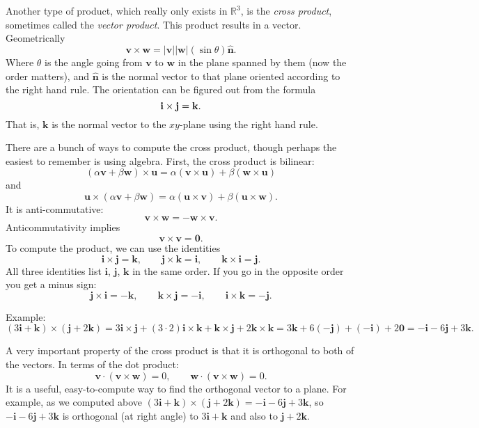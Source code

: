 \documentclass[12pt]{article}
\newcommand{\sabs}[1]{\lvert {#1} \rvert}
\newcommand{\R}{{\mathbb{R}}}
\newcommand{\veci}{\mathbf{i}}
\newcommand{\vecj}{\mathbf{j}}
\newcommand{\veck}{\mathbf{k}}
\newcommand{\avoidbreak}{\postdisplaypenalty=100}
\begin{document}
Another type of product, which really only exists in $\R^3$, is the
\emph{cross product},
sometimes called the \emph{vector product}.
This product results in a vector.
Geometrically
\[
\mathbf{v} \times \mathbf{w} = \sabs{\mathbf{v}} \sabs{\mathbf{w}} (\sin \theta) \hat{\mathbf{n}} .
\]
Where $\theta$ is the angle going from $\mathbf{v}$ to $\mathbf{w}$ in the plane spanned by them
(now the order matters),
and $\hat{\mathbf{n}}$ is the normal vector to that plane oriented according to the right hand rule.
The orientation can be figured out from the formula
\[
\veci \times \vecj = \veck .
\avoidbreak
\]
That is, $\veck$ is the normal vector to the $xy$-plane using the right hand rule.

There are a bunch of ways to compute the cross product, though perhaps the easiest to remember
is using algebra.
First, the cross product is bilinear:
\[
( \alpha \mathbf{v} + \beta \mathbf{w} ) \times \mathbf{u}
=
\alpha (\mathbf{v} \times \mathbf{u}) + \beta (\mathbf{w} \times \mathbf{u})
\]
and
\[
\mathbf{u} \times
( \alpha \mathbf{v} + \beta \mathbf{w} )
=
\alpha (\mathbf{u} \times \mathbf{v}) + \beta (\mathbf{u} \times \mathbf{w}) .
\]
It is anti-commutative:
\[
\mathbf{v} \times \mathbf{w} = - \mathbf{w} \times \mathbf{v} .
\]
Anticommutativity implies
\[
\mathbf{v} \times \mathbf{v} = \mathbf{0} .
\]
To compute the product, we can use the identities
\[
\veci \times \vecj = \veck , \qquad
\vecj \times \veck = \veci , \qquad
\veck \times \veci = \vecj .
\]
All three identities list $\veci$, $\vecj$, $\veck$ in the same order.
If you go in the opposite order you get a minus sign:
\[
\vecj \times \veci = -\veck , \qquad
\veck \times \vecj = -\veci , \qquad
\veci \times \veck = -\vecj .
\]

Example:
\[
(3 \veci + \veck) \times (\vecj + 2 \veck)
=
3 \veci \times \vecj + (3 \cdot 2) \veci \times \veck
+
\veck \times \vecj + 2 \veck \times \veck
=
3 \veck + 6 ( - \vecj)
+
(-\veci) + 2 \mathbf{0}
=
-\veci - 6\vecj + 3 \veck .
\]

A very important property of the cross product is that it is orthogonal
to both of the vectors.
In terms of the dot product:
\[
\mathbf{v} \cdot (\mathbf{v} \times \mathbf{w}) = 0 , \qquad
\mathbf{w} \cdot (\mathbf{v} \times \mathbf{w}) = 0 .
\]
It is a useful, easy-to-compute way to find the orthogonal vector to a plane.
For example, as we computed above
$(3 \veci + \veck) \times (\vecj + 2 \veck)
=
-\veci - 6\vecj + 3 \veck$, so
$-\veci - 6\vecj + 3 \veck$ is orthogonal
(at right angle) to 
$3 \veci + \veck$ and also to
$\vecj + 2 \veck$.
\end{document}
